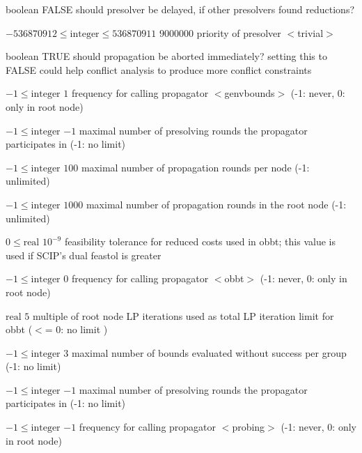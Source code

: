 %
{boolean}%
{FALSE}%
{should presolver be delayed, if other presolvers found reductions?}%
{}

%
{$-536870912\leq\textrm{integer}\leq536870911$}%
{$9000000$}%
{priority of presolver $<$trivial$>$}%
{}

%
{boolean}%
{TRUE}%
{should propagation be aborted immediately? setting this to FALSE could help conflict analysis to produce more conflict constraints}%
{}

%
{$-1\leq\textrm{integer}$}%
{$1$}%
{frequency for calling propagator $<$genvbounds$>$ (-1: never, 0: only in root node)}%
{}

%
{$-1\leq\textrm{integer}$}%
{$-1$}%
{maximal number of presolving rounds the propagator participates in (-1: no limit)}%
{}

%
{$-1\leq\textrm{integer}$}%
{$100$}%
{maximal number of propagation rounds per node (-1: unlimited)}%
{}

%
{$-1\leq\textrm{integer}$}%
{$1000$}%
{maximal number of propagation rounds in the root node (-1: unlimited)}%
{}

%
{$0\leq\textrm{real}$}%
{$10^{- 9}$}%
{feasibility tolerance for reduced costs used in obbt; this value is used if SCIP's dual feastol is greater}%
{}

%
{$-1\leq\textrm{integer}$}%
{$0$}%
{frequency for calling propagator $<$obbt$>$ (-1: never, 0: only in root node)}%
{}

%
{$\textrm{real}$}%
{$5$}%
{multiple of root node LP iterations used as total LP iteration limit for obbt ($<$= 0: no limit )}%
{}

%
{$-1\leq\textrm{integer}$}%
{$3$}%
{maximal number of bounds evaluated without success per group (-1: no limit)}%
{}

%
{$-1\leq\textrm{integer}$}%
{$-1$}%
{maximal number of presolving rounds the propagator participates in (-1: no limit)}%
{}

%
{$-1\leq\textrm{integer}$}%
{$-1$}%
{frequency for calling propagator $<$probing$>$ (-1: never, 0: only in root node)}%
{}

